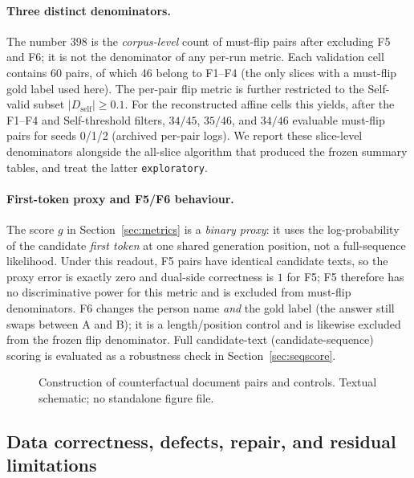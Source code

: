 \documentclass[11pt,a4paper]{article}
\begin{document}
\paragraph{Three distinct denominators.} The number $398$ is the
\emph{corpus-level} count of must-flip pairs after excluding F5 and F6; it is
not the denominator of any per-run metric. Each validation cell contains 60
pairs, of which 46 belong to F1--F4 (the only slices with a must-flip gold
label used here). The per-pair flip metric is further restricted to the
Self-valid subset $|D_{\mathrm{self}}|\ge0.1$. For the reconstructed affine
cells this yields, after the F1--F4 and Self-threshold filters, $34/45$,
$35/46$, and $34/46$ evaluable must-flip pairs for seeds 0/1/2 (archived
per-pair logs). We report these slice-level denominators alongside the
all-slice algorithm that produced the frozen summary tables, and treat the
latter \texttt{exploratory}.

\paragraph{First-token proxy and F5/F6 behaviour.} The score $g$ in
Section~\ref{sec:metrics} is a \emph{binary proxy}: it uses the log-probability
of the candidate \emph{first token} at one shared generation position, not a
full-sequence likelihood. Under this readout, F5 pairs have identical candidate
texts, so the proxy error is exactly zero and dual-side correctness is $1$ for
F5; F5 therefore has no discriminative power for this metric and is excluded
from must-flip denominators. F6 changes the person name \emph{and} the gold
label (the answer still swaps between A and B); it is a length/position control
and is likewise excluded from the frozen flip denominator. Full candidate-text
(candidate-sequence) scoring is evaluated as a robustness check in
Section~\ref{sec:seqscore}.

\begin{figure}[t]
\centering
{}
\caption{Construction of counterfactual document pairs and controls. Textual
schematic; no standalone figure file.}
\label{fig:f3}
\end{figure}

\subsection{Data correctness, defects, repair, and residual limitations}
\label{sec:datafix}
\end{document}

